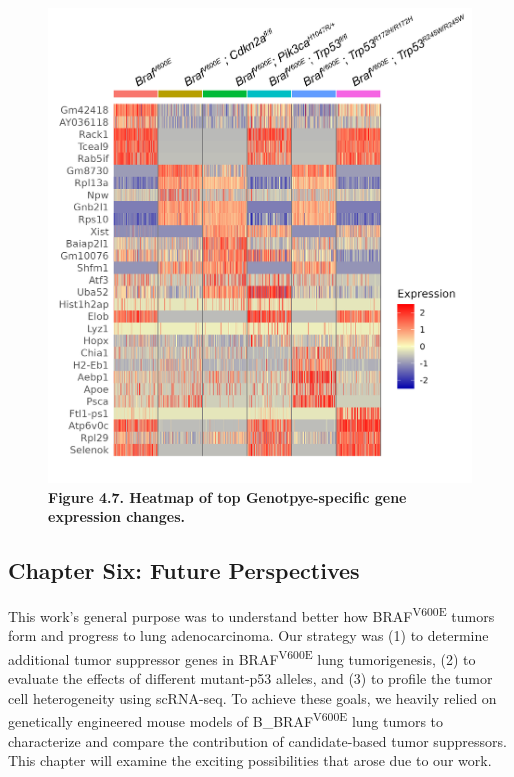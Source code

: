 \begin{figure}
\hypertarget{fig:04}{%
\centering
\includegraphics[width=1\textwidth,height=\textheight]{images/scrna_7.png}
\caption{\textbf{Figure 4.7. Heatmap of top Genotpye-specific gene expression changes.}}\label{fig:04}
}
\end{figure}

\hypertarget{chapter-six-future-perspectives}{%
\subsection{Chapter Six: Future Perspectives}\label{chapter-six-future-perspectives}}

This work's general purpose was to understand better how BRAF\textsuperscript{V600E} tumors form and progress to lung adenocarcinoma. Our strategy was (1) to determine additional tumor suppressor genes in BRAF\textsuperscript{V600E} lung tumorigenesis, (2) to evaluate the effects of different mutant-p53 alleles, and (3) to profile the tumor cell heterogeneity using scRNA-seq. To achieve these goals, we heavily relied on genetically engineered mouse models of B\_BRAF\textsuperscript{V600E} lung tumors to characterize and compare the contribution of candidate-based tumor suppressors. This chapter will examine the exciting possibilities that arose due to our work.

